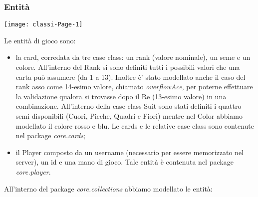 \subsubsection{Entità}
\begin{center}
    \texttt{[image: classi-Page-1]}
\end{center}
Le entità di gioco sono:
\begin{itemize}
    \item la card, corredata da tre case class: un rank (valore nominale), un seme e un colore.
    All’interno del Rank si sono definiti tutti i possibili valori che una carta può assumere (da 1 a 13). Inoltre è’ stato modellato anche il caso del rank asso come 14-esimo valore, chiamato \textit{overflowAce}, per poterne effettuare la validazione qualora si trovasse dopo il Re (13-esimo valore) in una combinazione.
    All’interno della case class Suit sono stati definiti i quattro semi disponibili (Cuori, Picche, Quadri e Fiori) mentre nel Color abbiamo modellato il colore rosso e blu. Le cards e le relative case class sono contenute nel package \textit{core.cards};
    \item il Player composto da un username (necessario per essere memorizzato nel server), un id e  una mano di gioco. Tale entità è contenuta nel package \textit{core.player}.
\end{itemize}
All’interno del package \textit{core.collections} abbiamo modellato le entità:
